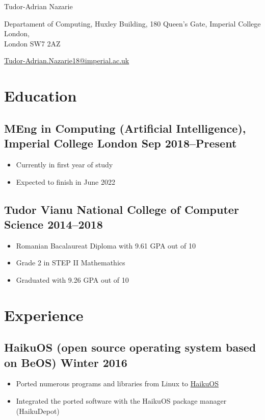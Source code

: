 \documentclass[a4paper]{article}
\begin{document}
\begin{center}
	{\huge\sffamily Tudor-Adrian Nazarie}

	\vspace{4pt}

	Departament of Computing, Huxley Building, 180 Queen's Gate, Imperial
	College London,\\ London SW7 2AZ

	\vspace{4pt}

	\href{mailto:tudor-adrian.nazarie18@imperial.ac.uk}{Tudor-Adrian.Nazarie18@imperial.ac.uk}

	\vspace{-12pt}
\end{center}

\section*{Education}
\subsection*{MEng in Computing (Artificial Intelligence), Imperial College
London \hfill Sep 2018--Present}
\begin{itemize}
	\item Currently in first year of study
	\item Expected to finish in June 2022
\end{itemize}

\subsection*{Tudor Vianu National College of Computer Science \hfill
2014--2018}
\begin{itemize}
	\item Romanian Bacalaureat Diploma with 9.61 GPA out of 10
	\item Grade 2 in STEP II Mathemathics
	\item Graduated with 9.26 GPA out of 10
\end{itemize}

\section*{Experience}
\subsection*{HaikuOS (open source operating system based on BeOS) \hfill Winter 2016}
\begin{itemize}
	\item Ported numerous programs and libraries from Linux to \href{https://www.haiku-os.org/}{HaikuOS}
	\item Integrated the ported software with the HaikuOS package manager
		(HaikuDepot)
\end{itemize}
\end{document}
